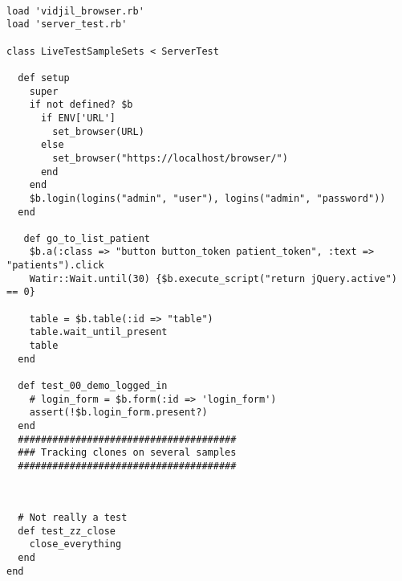 
\begin{verbatim}

load 'vidjil_browser.rb'
load 'server_test.rb'

class LiveTestSampleSets < ServerTest

  def setup
    super
    if not defined? $b
      if ENV['URL']
        set_browser(URL)
      else
        set_browser("https://localhost/browser/")
      end
    end
    $b.login(logins("admin", "user"), logins("admin", "password"))
  end

   def go_to_list_patient
    $b.a(:class => "button button_token patient_token", :text => "patients").click
    Watir::Wait.until(30) {$b.execute_script("return jQuery.active") == 0}

    table = $b.table(:id => "table")
    table.wait_until_present
    table
  end

  def test_00_demo_logged_in
    # login_form = $b.form(:id => 'login_form')
    assert(!$b.login_form.present?)
  end
  ######################################
  ### Tracking clones on several samples
  ######################################


\end{verbatim}



\begin{verbatim}

  # Not really a test
  def test_zz_close
    close_everything
  end
end
\end{verbatim}